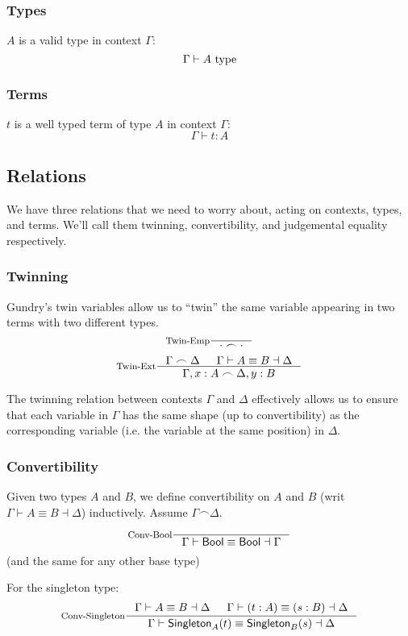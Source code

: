 \subsubsection{Types}
$A$ is a valid type in context $\Gamma$:
\[
  \Gamma \vdash A \textrm{ type}
\]

\subsubsection{Terms}
$t$ is a well typed term of type $A$ in context $\Gamma$:
\[
  \Gamma \vdash t : A
\]

\subsection{Relations}
We have three relations that we need to worry about, acting on contexts, types, and terms. We'll call them twinning, convertibility, and judgemental equality respectively.

\subsubsection{Twinning}
Gundry's twin variables \cite{gundry2013TypeInferenceHaskell} \cite{gundry2013TutorialImplementationDynamic} allow us to ``twin'' the same variable appearing in two terms with two different types.
\[
  \inference[Twin-Emp]{}{\cdot \frown \cdot}
\]
\[
  \inference[Twin-Ext]
    { \Gamma \frown \Delta
    & \Gamma \vdash A \equiv B \dashv \Delta
    }
    { \Gamma, x : A \frown \Delta, y : B }
\]

The twinning relation between contexts $\Gamma$ and $\Delta$ effectively allows us to ensure that each variable in $\Gamma$ has the same shape (up to convertibility) as the corresponding variable (i.e. the variable at the same position) in $\Delta$.

\subsubsection{Convertibility}
Given two types $A$ and $B$, we define convertibility on $A$ and $B$ (writ $\Gamma \vdash A \equiv B \dashv \Delta$) inductively. Assume $\Gamma \frown \Delta$.

\[
\inference[Conv-Bool]{}{\Gamma \vdash \Bool \equiv \Bool \dashv \Gamma}
\]
(and the same for any other base type)

For the singleton type:
\[
\inference[Conv-Singleton]
    { \Gamma \vdash A \equiv B \dashv \Delta
    & \Gamma \vdash (t : A) \equiv (s : B) \dashv \Delta
    }
    { \Gamma \vdash \Singleton{A}{t} \equiv \Singleton{B}{s} \dashv \Delta }
\]

